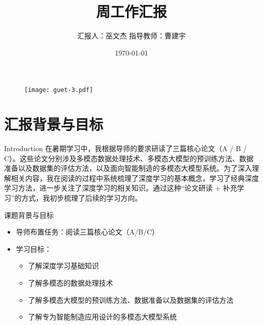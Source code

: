 \documentclass[aspectratio=169,AutoFakeBold]{beamer}
\author{汇报人：巫文杰 \texorpdfstring{\quad}{} 指导教师：曹建宇}
\title{周工作汇报}
\institute{计算机与信息安全学院}
\date{\today}
\begin{document}
\kaishu
\begin{frame}
    \titlepage
    \begin{figure}[htpb]
        \begin{center}
            \texttt{[image: guet-3.pdf]}
        \end{center}
    \end{figure}
\end{frame}

\begin{frame}
    \tableofcontents[sectionstyle=show,subsectionstyle=show/shaded/hide,subsubsectionstyle=show/shaded/hide]    
\end{frame}

\section{汇报背景与目标}
\begin{frame}{Introduction}
    \small
    在暑期学习中，我根据导师的要求研读了三篇核心论文（A / B / C）。这些论文分别涉及多模态数据处理技术、多模态大模型的预训练方法、数据准备以及数据集的评估方法，以及面向智能制造的多模态大模型系统。为了深入理解相关内容，我在阅读的过程中系统梳理了深度学习的基本概念，学习了经典深度学习方法，进一步关注了深度学习的相关知识。通过这种“论文研读 + 补充学习”的方式，我初步梳理了后续的学习方向。
\end{frame}
\begin{frame}{课题背景与目标}
    \begin{itemize}
        \item 导师布置任务：阅读三篇核心论文（A/B/C）
        \item 学习目标：
            \begin{itemize}
                \item 了解深度学习基础知识
                \item 了解多模态的数据处理技术
                \item 了解多模态大模型的预训练方法、数据准备以及数据集的评估方法
                \item 了解专为智能制造应用设计的多模态大模型系统
            \end{itemize}
    \end{itemize}
\end{frame}
\end{document}
